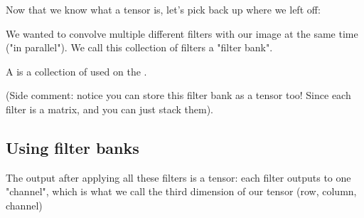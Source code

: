         Now that we know what a tensor is, let's pick back up where we left off:
        
        We wanted to convolve multiple different filters with our image at the same time ("in parallel"). We call this collection of filters a "filter bank".\\
        
        \begin{definition}
            A  is a collection of  used on the .
        \end{definition}
        
        (Side comment: notice you can store this filter bank as a tensor too! Since each filter is a matrix, and you can just stack them).
    
    \subsection{Using filter banks}
    
        The output after applying all these filters is a tensor: each filter outputs to one "channel", which is what we call the third dimension of our tensor (row, column, channel)
        
        
        
